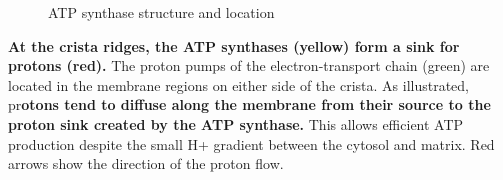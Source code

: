 \documentclass[../main.tex]{subfiles}
\begin{document}
\begin{figure}[H]
	\centering
	\caption{ATP synthase structure and location}
\end{figure}
\textbf{At the crista ridges, the ATP synthases (yellow) form 
a sink for protons (red).} The proton pumps 
of the electron-transport chain (green) are 
located in the membrane regions on either 
side of the crista. As illustrated, pr\textbf{otons 
tend to diffuse along the membrane from 
their source to the proton sink created by 
the ATP synthase.} This allows efficient ATP 
production despite the small H+ gradient 
between the cytosol and matrix. Red arrows 
show the direction of the proton flow.
\end{document}
